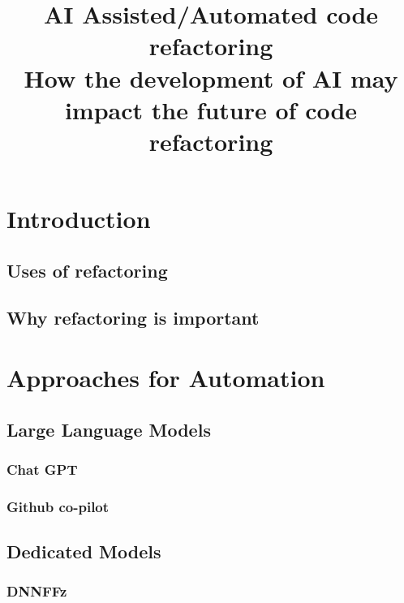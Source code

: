 \documentclass[conference]{IEEEtran}
\begin{document}
\title{AI Assisted/Automated code refactoring\\
{\footnotesize How the development of AI may impact the future of code refactoring}
}

\author{
    \and
}

\maketitle



\section{Introduction}

\subsection{Uses of refactoring}
\subsection{Why refactoring is important}

\section{Approaches for Automation}

\subsection{Large Language Models}
\subsubsection{Chat GPT}
\subsubsection{Github co-pilot}
\subsection{Dedicated Models}
\subsubsection{DNNFFz}
\end{document}
